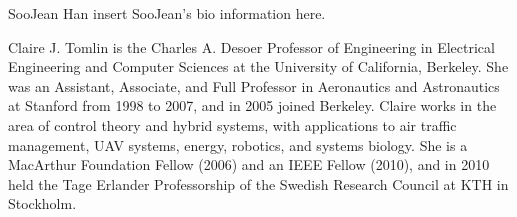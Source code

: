 \documentclass[journal]{IEEEtran}
\begin{document}
\begin{IEEEbiography}{SooJean Han}
	insert SooJean's bio information here.\vspace{-2cm}
\end{IEEEbiography}
\begin{IEEEbiography}{Claire J. Tomlin}
	is the Charles A. Desoer Professor of Engineering in Electrical Engineering and Computer Sciences at the University of California, Berkeley. She was an Assistant, Associate, and Full Professor in Aeronautics and Astronautics at Stanford from 1998 to 2007, and in 2005 joined Berkeley. Claire works in the area of control theory and hybrid systems, with applications to air traffic management, UAV systems, energy, robotics, and systems biology.  She is a MacArthur Foundation Fellow (2006) and an IEEE Fellow (2010), and in 2010 held the Tage Erlander Professorship of the Swedish Research Council at KTH in Stockholm.
\end{IEEEbiography}
\end{document}
